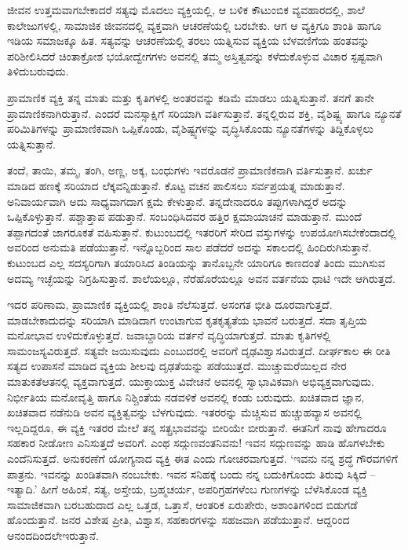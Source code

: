 ಜೀವನ ಉತ್ತಮವಾಗಬೇಕಾದರೆ ಸತ್ಯವು ಮೊದಲು ವ್ಯಕ್ತಿಯಲ್ಲಿ, ಆ ಬಳಿಕ ಕೌಟುಂಬಿಕ ವ್ಯವಹಾರದಲ್ಲಿ, ಶಾಲೆ ಕಾಲೇಜುಗಳಲ್ಲಿ, ಸಾಮಾಜಿಕ ಜೀವನದಲ್ಲಿ ವ್ಯಕ್ತವಾಗಿ ಆಚರಣೆಯಲ್ಲಿ ಬರಬೇಕು. ಆಗ ಆ ವ್ಯಕ್ತಿಗೂ ಶಾಂತಿ ಹಾಗೂ ಇಡಿಯ ಸಮಾಜಕ್ಕೂ ಹಿತ. ಸತ್ಯವನ್ನು ಆಚರಣೆಯಲ್ಲಿ ತರಲು ಯತ್ನಿಸುವ ವ್ಯಕ್ತಿಯ ಬೆಳವಣಿಗೆಯ ಹಂತವನ್ನು ಪರಿಶೀಲಿಸಿದರೆ ಚಿಂತಾಕ್ರೋಶ ಭಯೋದ್ವೇಗಗಳು ಅವನಲ್ಲಿ ತಮ್ಮ ಅಸ್ತಿತ್ವವನ್ನು ಕಳೆದುಕೊಳ್ಳುವ ವಿಚಾರ ಸ್ಪಷ್ಟವಾಗಿ ತಿಳಿದು\break ಬರುವುದು.

ಪ್ರಾಮಾಣಿಕ ವ್ಯಕ್ತಿ ತನ್ನ ಮಾತು ಮತ್ತು ಕೃತಿಗಳಲ್ಲಿ ಅಂತರವನ್ನು ಕಡಿಮೆ ಮಾಡಲು ಯತ್ನಿಸುತ್ತಾನೆ. ತನಗೆ ತಾನೇ ಪ್ರಾಮಾಣಿಕನಾಗಿರುತ್ತಾನೆ. ಎಂದರೆ ಮನಸ್ಸಾಕ್ಷಿಗೆ ಸರಿಯಾಗಿ ವರ್ತಿಸುತ್ತಾನೆ. ತನ್ನಲ್ಲಿರುವ ಶಕ್ತಿ, ವೈಶಿಷ್ಟ್ಯ ಹಾಗೂ ನ್ಯೂನತೆ ಪರಿಮಿತಿಗಳನ್ನು ಪ್ರಾಮಾಣಿಕವಾಗಿ ಒಪ್ಪಿಕೊಂಡು, ವೈಶಿಷ್ಟ್ಯಗಳನ್ನು ವೃದ್ಧಿಸಿಕೊಂಡು ನ್ಯೂನತೆಗಳನ್ನು ತಿದ್ದಿಕೊಳ್ಳಲು ಯತ್ನಿಸುತ್ತಾನೆ.

ತಂದೆ, ತಾಯಿ, ತಮ್ಮ, ತಂಗಿ, ಅಣ್ಣ, ಅಕ್ಕ, ಬಂಧುಗಳು ಇವರೊಡನೆ ಪ್ರಾಮಾಣಿಕನಾಗಿ ವರ್ತಿಸುತ್ತಾನೆ. ಖರ್ಚು ಮಾಡಿದ ಹಣಕ್ಕೆ ಸರಿಯಾದ ಲೆಕ್ಕವನ್ನಿಡುತ್ತಾನೆ. ಕೊಟ್ಟ ವಚನ ಪಾಲಿಸಲು ಸರ್ವಪ್ರಯತ್ನ ಮಾಡುತ್ತಾನೆ. ಅನಿವಾರ್ಯವಾಗಿ ಅದು ಸಾಧ್ಯವಾಗದಾಗ ಕ್ಷಮೆ ಕೇಳುತ್ತಾನೆ. ತನ್ನದೇನಾದರೂ ತಪ್ಪುಗಳಾಗಿದ್ದರೆ ಅದನ್ನು ಒಪ್ಪಿಕೊಳ್ಳುತ್ತಾನೆ. ಪಶ್ಚಾತ್ತಾಪ ಪಡುತ್ತಾನೆ. ಸಂಬಂಧಿಸಿದವರ ಹತ್ತಿರ ಕ್ಷಮಾಯಾಚನೆ ಮಾಡುತ್ತಾನೆ. ಮುಂದೆ ತಪ್ಪಾಗದಂತೆ ಜಾಗರೂಕತೆ ವಹಿಸುತ್ತಾನೆ. ಕುಟುಂಬದಲ್ಲಿ ಇತರರಿಗೆ ಸೇರಿದ ವಸ್ತುಗಳನ್ನು ಉಪಯೋಗಿಸಬೇಕೆಂದಾದಲ್ಲಿ ಅವರಿಂದ ಅನುಮತಿ ಪಡೆಯುತ್ತಾನೆ. ಇನ್ನೊಬ್ಬರಿಂದ ಸಾಲ ಪಡೆದರೆ ಅದನ್ನು ಸಕಾಲದಲ್ಲಿ ಹಿಂದಿರುಗಿಸುತ್ತಾನೆ. ಕುಟುಂಬದ ಎಲ್ಲ ಸದಸ್ಯರಿಗಾಗಿ ತಯಾರಿಸಿದ ತಿಂಡಿಯನ್ನು ತಾನೊಬ್ಬನೇ ಯಾರಿಗೂ ಕಾಣದಂತೆ ತಿಂದು ಮುಗಿಸುವ ಅದಮ್ಯ ಇಚ್ಛೆಯನ್ನು ನಿಗ್ರಹಿಸುತ್ತಾನೆ. ಶಾಲೆಯಲ್ಲೂ, ನೆರೆಹೊರೆಯಲ್ಲೂ ಅವನ ವರ್ತನೆಯ ಧಾಟಿ ಇದೇ ಆಗಿರುತ್ತದೆ.

ಇದರ ಪರಿಣಾಮ, ಪ್ರಾಮಾಣಿಕ ವ್ಯಕ್ತಿಯಲ್ಲಿ ಶಾಂತಿ ನೆಲೆಸುತ್ತದೆ. ಅಸಂಗತ ಭೀತಿ ದೂರವಾಗುತ್ತದೆ. ಮಾಡಬೇಕಾದುದನ್ನು ಸರಿಯಾಗಿ ಮಾಡಿದಾಗ ಉಂಟಾಗುವ ಕೃತಕೃತ್ಯತೆಯ ಭಾವನೆ ಬರುತ್ತದೆ. ಸದಾ ತೃಪ್ತಿಯ ಮನೋಭಾವ ಉಳಿದುಕೊಳ್ಳುತ್ತದೆ. ಜವಾಬ್ದಾರಿಯ ವರ್ತನೆ ವೃದ್ಧಿಯಾಗುತ್ತದೆ. ಮಾತು ಕೃತಿಗಳಲ್ಲಿ ಸಾಮಂಜಸ್ಯವಿರುತ್ತದೆ. ಸತ್ಯವೇ ಜಯಿಸುವುದು ಎಂಬುದರಲ್ಲಿ ಅವರಿಗೆ ದೃಢವಿಶ್ವಾಸವಿರುತ್ತದೆ. ದೀರ್ಘಕಾಲ ಈ ರೀತಿ ಸತ್ಯದ ಉಪಾಸನೆ ಮಾಡಿದ ವ್ಯಕ್ತಿಯ ಶೀಲವು ದೃಢತೆಯನ್ನು ಪಡೆಯುತ್ತದೆ. ಮುಚ್ಚುಮರೆಯಿಲ್ಲದ ನೇರ ಮಾತುಕತೆ\break ಆತನಲ್ಲಿ ವ್ಯಕ್ತವಾಗುತ್ತದೆ. ಯುಕ್ತಾಯುಕ್ತ ವಿವೇಚನೆ ಅವನಲ್ಲಿ ಸ್ವಾಭಾವಿಕವಾಗಿ ಅಭಿವ್ಯಕ್ತವಾಗುವುದು. ನಿರ್ಭೀತಿಯ ಮನೋವೃತ್ತಿ ಹಾಗೂ ನಿಶ್ಚಿಂತೆಯ ನಡವಳಿಕೆ ಅವನಲ್ಲಿ ಕಂಡು ಬರುವುದು. ಖಚಿತವಾದ ಜ್ಞಾನ, ಖಚಿತವಾದ ನಡೆನುಡಿ ಅವನ ವ್ಯಕ್ತಿತ್ವವನ್ನು ಬೆಳಗುವುದು. ಇತರರನ್ನು ಮೆಚ್ಚಿಸುವ ಹುಚ್ಚುಹವ್ಯಾಸ ಅವನಲ್ಲಿ ಇಲ್ಲದಿದ್ದರೂ, ಈ ವ್ಯಕ್ತಿ ಇತರರ ಮೇಲೆ ತನ್ನ ಸತ್ಪ್ರಭಾವವನ್ನು ಬೀರಿಯೇ ಬೀರುತ್ತಾನೆ. ಈತನಿಗೆ ನಾವು ಹೇಗಾದರೂ ಸಹಕಾರ ನೀಡೋಣ ಎನಿಸುತ್ತದೆ ಅವರಿಗೆ. ಎಂಥ ಸದ್ಗುಣವಂತನಿವನು! ಇವನ ಸದ್ಗುಣವನ್ನು ಹಾಡಿ ಹೊಗಳಬೇಕು ಎಂದೆನಿಸುತ್ತದೆ. ಅನುಕರಣೆಗೆ ಯೋಗ್ಯನಾದ ವ್ಯಕ್ತಿ ಈತ ಎಂದು ಗೋಚರವಾಗುತ್ತದೆ. ‘ಇವನು ನನ್ನ ಶ್ರದ್ಧೆ ಗೌರವಗಳಿಗೆ ಪಾತ್ರನು. ಇವನನ್ನು ಖಂಡಿತವಾಗಿ ನಂಬಬೇಕು. ಇವನ ಸನಿಹಕ್ಕೆ ಬಂದು ನನ್ನ ಬದುಕಿಗೊಂದು ತಿರುವು ಸಿಕ್ಕಿದೆ – ಇತ್ಯಾದಿ.’ ಹೀಗೆ ಅಹಿಂಸೆ, ಸತ್ಯ, ಅಸ್ತೇಯ, ಬ್ರಹ್ಮಚರ್ಯ, ಅಪರಿಗ್ರಹಗಳೆಂಬ ಗುಣಗಳನ್ನು ಬೆಳೆಸಿಕೊಂಡ ವ್ಯಕ್ತಿ ಸಾಮಾಜಿಕವಾಗಿ ಬರಬಹುದಾದ ಎಲ್ಲ ಒತ್ತಡ, ಒತ್ತಾಸೆ, ಆಂತರಿಕ ಏರುಪೇರು, ಅಶಾಂತಿಗಳಿಂದ ಬಿಡುಗಡೆ ಹೊಂದುತ್ತಾನೆ. ಜನರ ವಿಶೇಷ ಪ್ರೀತಿ, ವಿಶ್ವಾಸ, ಸಹಕಾರಗಳನ್ನು ಸಹಜವಾಗಿ ಪಡೆಯುತ್ತಾನೆ. ಆದ್ದರಿಂದ ಆನಂದದಿಂದಲೇ\break ಇರುತ್ತಾನೆ.

